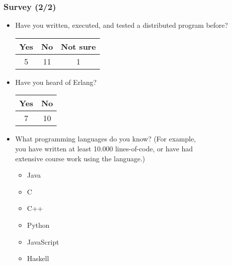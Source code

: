 \begin{frame}

\frametitle{Survey (2/2)}

\begin{itemize}

\footnotesize

\item Have you written, executed, and tested a distributed program before?

\begin{tabular}{|c|c|c|}
\hline
\textbf{Yes} & \textbf{No} & \textbf{Not sure}
\\\hline
5 & 11 & 1
\\\hline
\end{tabular}

\item Have you heard of Erlang?

\begin{tabular}{|c|c|}
\hline
\textbf{Yes} & \textbf{No}
\\\hline
7 & 10
\\\hline
\end{tabular}

\item What programming languages do you know? (For example,\\ you have
written at least 10.000 lines-of-code, or have had\\ extensive course
work using the language.)

\begin{multicols}{2}
\begin{itemize}

\item Java

\item C

\item C++

\item Python

\item JavaScript

\item Haskell

\end{itemize}
\end{multicols}

\end{itemize}

\end{frame}
